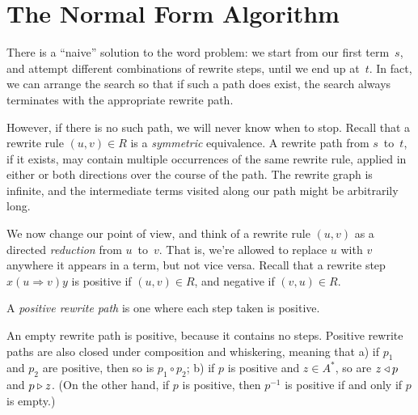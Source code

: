 \documentclass[../generics]{subfiles}
\begin{document}
\section{The Normal Form Algorithm}\label{rewritesystemintro}

There is a ``naive'' solution to the word problem: we start from our first term~$s$, and attempt different combinations of rewrite steps, until we end up at~$t$. In fact, we can arrange the search so that if such a path does exist, the search always terminates with the appropriate rewrite path.

However, if there is no such path, we will never know when to stop. Recall that a rewrite rule $(u, v)\in R$ is a \emph{symmetric} equivalence. A rewrite path from $s$~to~$t$, if it exists, may contain multiple occurrences of the same rewrite rule, applied in either or both directions over the course of the path. The rewrite graph is infinite, and the intermediate terms visited along our path might be arbitrarily long.

\begin{center}
\end{center}

We now change our point of view, and think of a rewrite rule $(u,v)$ as a directed \emph{reduction} from $u$~to~$v$. That is, we're allowed to replace $u$ with $v$ anywhere it appears in a term, but not vice versa. Recall that a rewrite step $x(u\Rightarrow v)y$ is positive if $(u,v)\in R$, and negative if $(v,u)\in R$.

\begin{definition}
A \emph{positive rewrite path} is one where each step taken is positive.
\end{definition}
An empty rewrite path is positive, because it contains no steps. Positive rewrite paths are also closed under composition and whiskering, meaning that a) if $p_1$ and $p_2$ are positive, then so is $p_1\circ p_2$; b) if $p$ is positive and $z\in A^*$, so are $z\triangleleft p$ and $p\triangleright z$. (On the other hand, if $p$ is positive, then $p^{-1}$ is positive if and only if $p$ is empty.)
\end{document}
